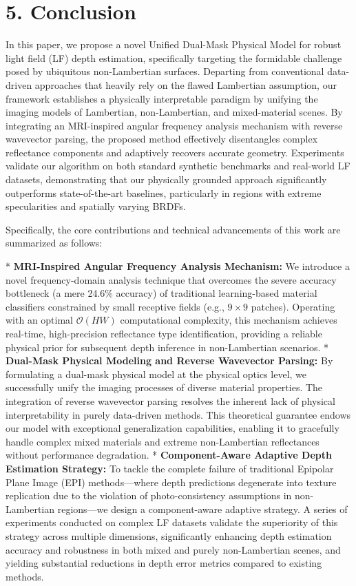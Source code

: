 \section{5. Conclusion}


In this paper, we propose a novel Unified Dual-Mask Physical Model for robust light field (LF) depth estimation, specifically targeting the formidable challenge posed by ubiquitous non-Lambertian surfaces. Departing from conventional data-driven approaches that heavily rely on the flawed Lambertian assumption, our framework establishes a physically interpretable paradigm by unifying the imaging models of Lambertian, non-Lambertian, and mixed-material scenes. By integrating an MRI-inspired angular frequency analysis mechanism with reverse wavevector parsing, the proposed method effectively disentangles complex reflectance components and adaptively recovers accurate geometry. Experiments validate our algorithm on both standard synthetic benchmarks and real-world LF datasets, demonstrating that our physically grounded approach significantly outperforms state-of-the-art baselines, particularly in regions with extreme specularities and spatially varying BRDFs.

Specifically, the core contributions and technical advancements of this work are summarized as follows:

*   \textbf{MRI-Inspired Angular Frequency Analysis Mechanism:} We introduce a novel frequency-domain analysis technique that overcomes the severe accuracy bottleneck (a mere 24.6\% accuracy) of traditional learning-based material classifiers constrained by small receptive fields (e.g., \(9 \times 9\) patches). Operating with an optimal \(\mathcal{O}(HW)\) computational complexity, this mechanism achieves real-time, high-precision reflectance type identification, providing a reliable physical prior for subsequent depth inference in non-Lambertian scenarios.
*   \textbf{Dual-Mask Physical Modeling and Reverse Wavevector Parsing:} By formulating a dual-mask physical model at the physical optics level, we successfully unify the imaging processes of diverse material properties. The integration of reverse wavevector parsing resolves the inherent lack of physical interpretability in purely data-driven methods. This theoretical guarantee endows our model with exceptional generalization capabilities, enabling it to gracefully handle complex mixed materials and extreme non-Lambertian reflectances without performance degradation.
*   \textbf{Component-Aware Adaptive Depth Estimation Strategy:} To tackle the complete failure of traditional Epipolar Plane Image (EPI) methods—where depth predictions degenerate into texture replication due to the violation of photo-consistency assumptions in non-Lambertian regions—we design a component-aware adaptive strategy. A series of experiments conducted on complex LF datasets validate the superiority of this strategy across multiple dimensions, significantly enhancing depth estimation accuracy and robustness in both mixed and purely non-Lambertian scenes, and yielding substantial reductions in depth error metrics compared to existing methods.

